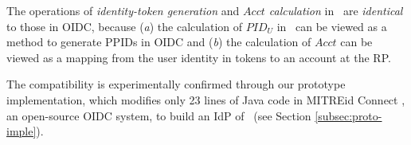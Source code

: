 The operations of \emph{identity-token generation} and \emph{$Acct$ calculation} in \usso\ are \emph{identical} to those in OIDC,
 because (\emph{a}) the calculation of $PID_U$ in \usso\ can be viewed as a method to generate PPIDs in OIDC and (\emph{b}) the calculation of $Acct$ can be viewed as a mapping from the user identity in tokens to an account at the RP.

The compatibility is experimentally confirmed through our prototype implementation, which modifies only 23 lines of Java code in MITREid Connect \cite{MITREid}, an open-source OIDC system, to build an IdP of \usso\ (see Section \ref{subsec:proto-imple}).

